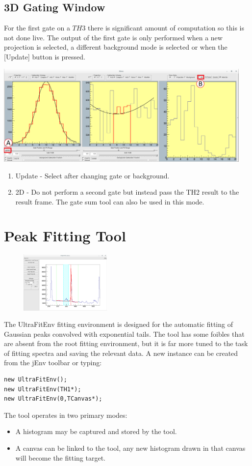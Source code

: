 \documentclass[a4paper,10pt]{article}
\begin{document}
\subsection{3D Gating Window}
For the first gate on a $TH3$ there is significant amount of computation so this is not done live. The output of the first gate is only performed when a new projection is selected, a different background mode is selected or when the [Update] button is pressed.
\begin{center}
\includegraphics[width=0.95\textwidth]{jGateA.png}
\begin{enumerate}
\item Update - Select after changing gate or background.
\item 2D - Do not perform a second gate but instead pass the TH2 result to the result frame. The gate sum tool can also be used in this mode.
\end{enumerate}
\end{center}

\newpage
\section{Peak Fitting Tool}\label{sec:peakfit}
\begin{figure}
\includegraphics[width=0.4\textwidth]{jFitB.png}
\end{figure}
The UltraFitEnv fitting environment is designed for the automatic fitting of Gaussian peaks convolved with exponential tails.
The tool has some foibles that are absent from the root fitting environment, but it is far more tuned to the task of fitting spectra and saving the relevant data.
A new instance can be created from the jEnv toolbar or typing:
\lstset{language=C++}
\begin{lstlisting}
new UltraFitEnv();
new UltraFitEnv(TH1*);
new UltraFitEnv(0,TCanvas*);
\end{lstlisting}
The tool operates in two primary modes:
\begin{itemize}
\item A histogram may be captured and stored by the tool.
\item A canvas can be linked to the tool, any new histogram drawn in that canvas will become the fitting target.
\end{itemize}
\end{document}
